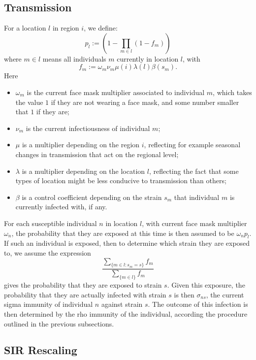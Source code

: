 \documentclass[10pt,letterpaper]{article}
\begin{document}
\subsection*{Transmission}

For a location $l$ in region $i$, we define:
\begin{equation*}
p_l := \left(1 - \prod_{m \in l} (1 - f_m)\right)
\end{equation*}
where $m \in l$ means all individuals $m$ currently in location $l$, with
\begin{equation*}
f_m  := \omega_m \nu_m \mu(i) \lambda(l) \beta(s_m).
\end{equation*}
Here
\begin{itemize}
\item $\omega_m$ is the current face mask multiplier associated to individual $m$, which takes the value $1$ if they are not wearing a face mask, and some number smaller that $1$ if they are;
\item $\nu_m$ is the current infectiousness of individual $m$;
\item $\mu$ is a multiplier depending on the region $i$, reflecting for example seasonal changes in transmission that act on the regional level;
\item $\lambda$ is a multiplier depending on the location $l$, reflecting the fact that some types of location might be less conducive to transmission than others;
\item $\beta$ is a control coefficient depending on the strain $s_m$ that individual $m$ is currently infected with, if any.
\end{itemize}
For each susceptible individual $n$ in location $l$, with current face mask multiplier $\omega_n$, the probability that they are exposed at this time is then assumed to be $\omega_n p_l$. If such an individual is exposed, then to determine which strain they are exposed to, we assume the expression
\begin{equation*}
\frac{\sum_{\{m \in l: s_m = s\}} f_m}{\sum_{\{m \in l\}} f_m}
\end{equation*}
gives the probability that they are exposed to strain $s$. Given this exposure, the probability that they are actually infected with strain $s$ is then $\sigma_{ns}$, the current sigma immunity of individual $n$ against strain $s$. The outcome of this infection is then determined by the rho immunity of the individual, according the procedure outlined in the previous subsections.

\subsection*{SIR Rescaling}
\end{document}
